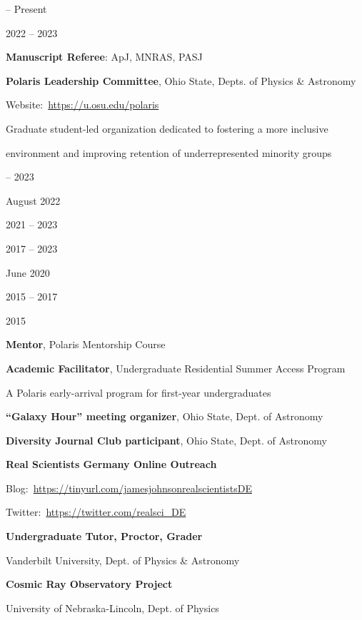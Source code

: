 \documentclass[cv.tex]{subfiles}
\begin{document}
\parbox{0.18\textwidth}{%
	 -- Present \par
	2022 -- 2023 \par
	\null \par
	\null \par
	\null \par
}
\hspace{1mm}
\parbox{0.8\textwidth}{%
	\vspace{1mm}
	\textbf{Manuscript Referee}: ApJ, MNRAS, PASJ \par
	\textbf{Polaris Leadership Committee}, Ohio State, Depts. of Physics \&
	Astronomy \par
	Website:~\url{https://u.osu.edu/polaris} \par
	Graduate student-led organization dedicated to fostering a more inclusive
	\par
	environment and improving retention of underrepresented minority groups \par
}

\noindent
\parbox{0.18\textwidth}{%
	 -- 2023 \par
	August 2022 \par
	\null \par
	2021 -- 2023 \par
	2017 -- 2023 \par
	June 2020 \par
	\null \par
	\null \par
	2015 -- 2017 \par
	\null \par
	2015 \par
	\null \par
}
\hspace{1mm}
\parbox{0.8\textwidth}{%
	\vspace{1mm}
	\textbf{Mentor}, Polaris Mentorship Course \par
	\textbf{Academic Facilitator}, Undergraduate Residential Summer Access
	Program \par
	A Polaris early-arrival program for first-year undergraduates \par
	\textbf{``Galaxy Hour'' meeting organizer}, Ohio State, Dept. of Astronomy
	\par
	\textbf{Diversity Journal Club participant}, Ohio State,
	Dept. of Astronomy \par
	\textbf{Real Scientists Germany Online Outreach} \par
	Blog:~\url{https://tinyurl.com/jamesjohnsonrealscientistsDE} \par
	Twitter:~\url{https://twitter.com/realsci_DE} \par
	\textbf{Undergraduate Tutor, Proctor, Grader} \par
	Vanderbilt University, Dept. of Physics \& Astronomy \par
	\textbf{Cosmic Ray Observatory Project} \par
	University of Nebraska-Lincoln, Dept. of Physics \par
}
\end{document}

